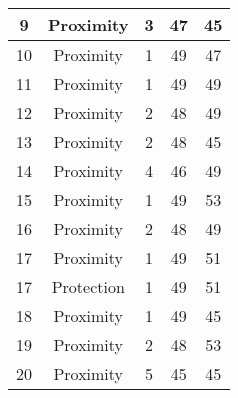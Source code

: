\documentclass[results.tex]{subfiles}
\begin{document}
\begin{center}
\begin{tabular}{| c || c | c | c | c |}
            \hline
            9                       & Proximity                    & 3                      & 47                      & 45                   \\
            \hline
            10                      & Proximity                    & 1                      & 49                      & 47                   \\
            \hline
            11                      & Proximity                    & 1                      & 49                      & 49                   \\
            \hline
            12                      & Proximity                    & 2                      & 48                      & 49                   \\
            \hline
            13                      & Proximity                    & 2                      & 48                      & 45                   \\
            \hline
            14                      & Proximity                    & 4                      & 46                      & 49                   \\
            \hline
            15                      & Proximity                    & 1                      & 49                      & 53                   \\
            \hline
            16                      & Proximity                    & 2                      & 48                      & 49                   \\
            \hline
            17                      & Proximity                    & 1                      & 49                      & 51                   \\
            \hline
            17                      & Protection                   & 1                      & 49                      & 51                   \\
            \hline
            18                      & Proximity                    & 1                      & 49                      & 45                   \\
            \hline
            19                      & Proximity                    & 2                      & 48                      & 53                   \\
            \hline
            20                      & Proximity                    & 5                      & 45                      & 45                   \\

\end{tabular}
\end{center}
\end{document}
